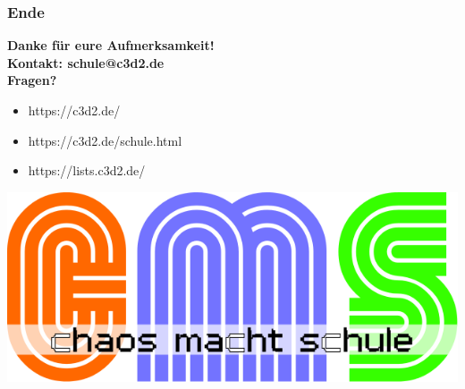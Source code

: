 \documentclass[12pt]{beamer}
\begin{document}
\begin{frame}
	\frametitle{Ende}
	\begin{center}
		\textbf{Danke für eure Aufmerksamkeit!} \\
		\textbf{Kontakt: schule@c3d2.de} \\
		\textbf{Fragen?} 
	\end{center}
	\begin{itemize}
		\item<1-> https://c3d2.de/
		\item<2-> https://c3d2.de/schule.html
		\item<4-> https://lists.c3d2.de/  
	\end{itemize}
\end{frame}

\begin{frame}
	\begin{center}
    	\includegraphics[height=0.5\textheight]{img//cms-text.png}
    \end{center}
\end{frame}
\end{document}
